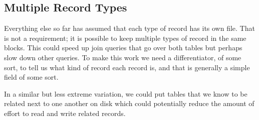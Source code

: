 \subsection*{Multiple Record Types}

Everything else so far has assumed that each type of record has its own file. That is not a requirement; it is possible to keep multiple types of record in the same blocks. This could speed up join queries that go over both tables but perhaps slow down other queries. To make this work we need a differentiator, of some sort, to tell us what kind of record each record is, and that is generally a simple field of some sort.

In a similar but less extreme variation, we could put tables that we know to be related next to one another on disk which could potentially reduce the amount of effort to read and write related records.





